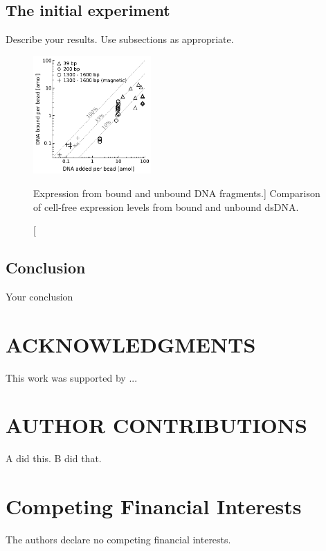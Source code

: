 \documentclass[10pt]{article}
\begin{document}
\subsection*{The initial experiment}

Describe your results. Use subsections as appropriate.

\begin{figure}[ht] %
\begin{center}
  \includegraphics[width=0.4\textwidth]{figures/fig_dna.pdf}
\end{center}
\vspace*{-7mm} %
\caption %
    [\label{sfig:bulkconcat} Expression from bound and unbound DNA fragments.]
    { %
      Comparison of cell-free expression levels from bound and unbound dsDNA.
    } 
\end{figure}

\subsection*{Conclusion}

Your conclusion

\section*{ACKNOWLEDGMENTS}

This work was supported by ...


\section*{AUTHOR CONTRIBUTIONS}

A did this. B did that.




\section*{Competing Financial Interests}

The authors declare no competing financial interests.
\end{document}
